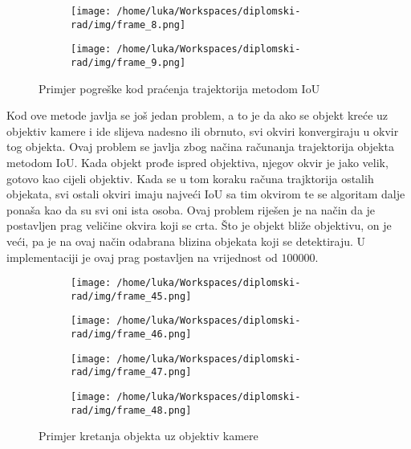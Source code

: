 \begin{figure}[htp]
	\centering
	\begin{subfigure}[b]{0.4\linewidth}
		\texttt{[image: /home/luka/Workspaces/diplomski-rad/img/frame\_8.png]}
	\end{subfigure}
	\begin{subfigure}[b]{0.4\linewidth}
		\texttt{[image: /home/luka/Workspaces/diplomski-rad/img/frame\_9.png]}
	\end{subfigure}
	\caption{Primjer pogreške kod praćenja trajektorija metodom IoU}
	\label{img:err-trajectories}
\end{figure}

Kod ove metode javlja se još jedan problem, a to je da ako se objekt kreće uz objektiv kamere i ide slijeva nadesno ili obrnuto, svi okviri konvergiraju u okvir tog objekta. Ovaj problem se javlja zbog načina računanja trajektorija objekta metodom IoU. Kada objekt prođe ispred objektiva, njegov okvir je jako velik, gotovo kao cijeli objektiv. Kada se u tom koraku računa trajktorija ostalih objekata, svi ostali okviri imaju najveći IoU sa tim okvirom te se algoritam dalje ponaša kao da su svi oni ista osoba. Ovaj problem riješen je na način da je postavljen prag veličine okvira koji se crta. Što je objekt bliže objektivu, on je veći, pa je na ovaj način odabrana blizina objekata koji se detektiraju. U implementaciji je ovaj prag postavljen na vrijednost od $100000$.

\begin{figure}[htp]
	\centering
	\begin{subfigure}[b]{0.4\linewidth}
		\texttt{[image: /home/luka/Workspaces/diplomski-rad/img/frame\_45.png]}
	\end{subfigure}
	\begin{subfigure}[b]{0.4\linewidth}
		\texttt{[image: /home/luka/Workspaces/diplomski-rad/img/frame\_46.png]}
	\end{subfigure}
	\begin{subfigure}[b]{0.4\linewidth}
		\texttt{[image: /home/luka/Workspaces/diplomski-rad/img/frame\_47.png]}
	\end{subfigure}
	\begin{subfigure}[b]{0.4\linewidth}
		\texttt{[image: /home/luka/Workspaces/diplomski-rad/img/frame\_48.png]}
	\end{subfigure}
	\caption{Primjer kretanja objekta uz objektiv kamere}
	\label{img:close-objective}
\end{figure}